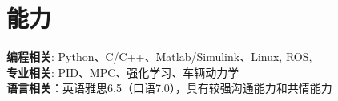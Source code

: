 \documentclass[letterpaper,11pt]{article}
\begin{document}


\section{能力}
 \begin{itemize}[leftmargin=0.15in, label={}]
    \small{\item{
    \vspace{1mm}
     \textbf{编程相关}{: Python、C/C++、Matlab/Simulink、Linux, ROS,} \\
     \vspace{1mm}
     \textbf{专业相关}{: PID、MPC、强化学习、车辆动力学} \\
     \vspace{1mm}
     \textbf{语言相关}{：英语雅思6.5（口语7.0），具有较强沟通能力和共情能力}

    }}
 \end{itemize}

\end{document}
